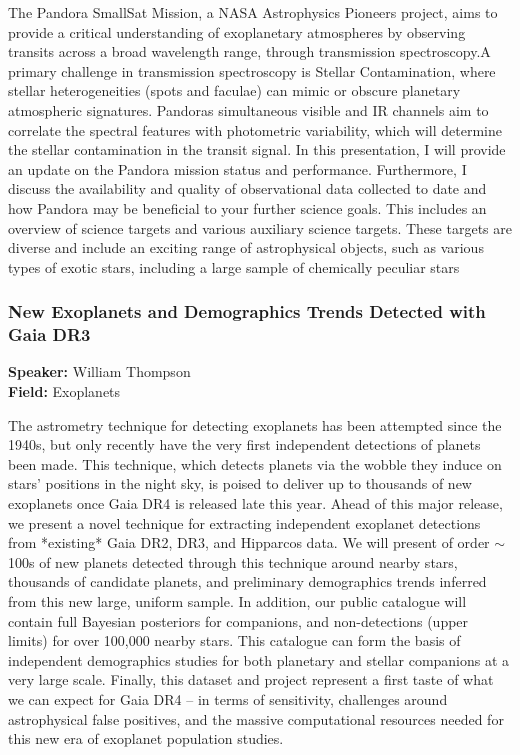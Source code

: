 The Pandora SmallSat Mission, a NASA Astrophysics Pioneers project, aims to provide a critical understanding of exoplanetary atmospheres by observing transits across a broad wavelength range, through transmission spectroscopy.A primary challenge in transmission spectroscopy is Stellar Contamination, where stellar heterogeneities (spots and faculae) can mimic or obscure planetary atmospheric signatures. Pandoras simultaneous visible and IR channels aim to correlate the spectral features with photometric variability, which will determine the stellar contamination in the transit signal. In this presentation, I will provide an update on the Pandora mission status and performance. Furthermore, I discuss the availability and quality of observational data collected to date and how Pandora may be beneficial to your further science goals. This includes an overview of science targets and various auxiliary science targets. These targets are diverse and include an exciting range of astrophysical objects, such as various types of exotic stars, including a large sample of chemically peculiar stars

\hypertarget{abstract-talk-284}{}\label{abstract-page-talk-284}
\subsubsection*{New Exoplanets and Demographics Trends Detected with Gaia DR3}
\textbf{Speaker:} William Thompson\\
\textbf{Field:} Exoplanets

The astrometry technique for detecting exoplanets has been attempted since the 1940s, but only recently have the very first independent detections of planets been made. This technique, which detects planets via the wobble they induce on stars' positions in the night sky, is poised to deliver up to thousands of new exoplanets once Gaia DR4 is released late this year. Ahead of this major release, we present a novel technique for extracting independent exoplanet detections from *existing* Gaia DR2, DR3, and Hipparcos data. We will present of order $\sim$100s of new planets detected through this technique around nearby stars, thousands of candidate planets, and preliminary demographics trends inferred from this new large, uniform sample. In addition, our public catalogue will contain full Bayesian posteriors for companions, and non-detections (upper limits) for over 100,000 nearby stars. This catalogue can form the basis of independent demographics studies for both planetary and stellar companions at a very large scale. Finally, this dataset and project represent a first taste of what we can expect for Gaia DR4 -- in terms of sensitivity, challenges around astrophysical false positives, and the massive computational resources needed for this new era of exoplanet population studies.

